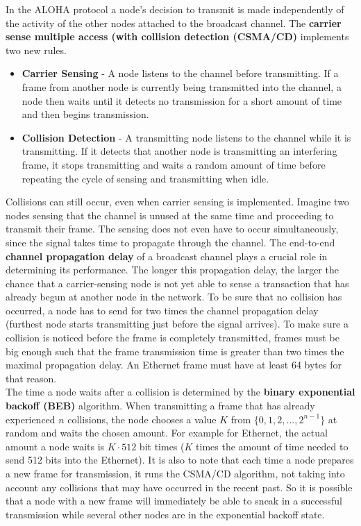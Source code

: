 In the ALOHA protocol a node's decision to transmit is made independently of the activity of the other nodes attached to the broadcast channel. The \textbf{carrier sense multiple access (with collision detection (CSMA/CD)} implements two new rules.
\begin{itemize}
\item \textbf{Carrier Sensing} - A node listens to the channel before transmitting. If a frame from another node is currently being transmitted into the channel, a node then waits until it detects no transmission for a short amount of time and then begins transmission.
\item \textbf{Collision Detection} - A transmitting node listens to the channel while it is transmitting. If it detects that another node is transmitting an interfering frame, it stops transmitting and waits a random amount of time before repeating the cycle of sensing and transmitting when idle.
\end{itemize} 
Collisions can still occur, even when carrier sensing is implemented. Imagine two nodes sensing that the channel is unused at the same time and proceeding to transmit their frame. The sensing does not even have to occur simultaneously, since the signal takes time to propagate through the channel. The end-to-end \textbf{channel propagation delay} of a broadcast channel plays a crucial role in determining its performance. The longer this propagation delay, the larger the chance that a carrier-sensing node is not yet able to sense a transaction that has already begun at another node in the network. To be sure that no collision has occurred, a node has to send for two times the channel propagation delay (furthest node starts transmitting just before the signal arrives). To make sure a collision is noticed before the frame is completely transmitted, frames must be big enough such that the frame transmission time is greater than two times the maximal propagation delay. An Ethernet frame must have at least 64 bytes for that reason.\\

The time a node waits after a collision is determined by the \textbf{binary exponential backoff (BEB)} algorithm. When transmitting a frame that has already experienced $n$ collisions, the node chooses a value $K$ from $\{0, 1, 2, ..., 2^{n-1}\}$ at random and waits the chosen amount. For example for Ethernet, the actual amount a node waits is $K \cdot 512$  bit times ($K$ times the amount of time needed to send 512 bits into the Ethernet). It is also to note that each time a node prepares a new frame for transmission, it runs the CSMA/CD algorithm, not taking into account any collisions that may have occurred in the recent past. So it is possible that a node with a new frame will immediately be able to sneak in a successful transmission while several other nodes are in the exponential backoff state.

